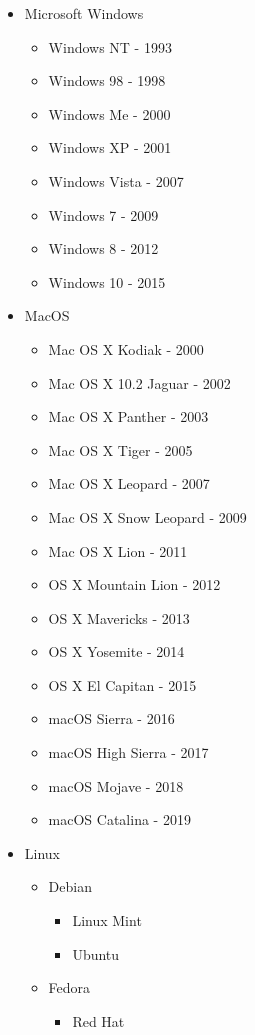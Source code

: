 \documentclass[12pt]{book}
\begin{document}
\begin{latin}
\begin{itemize}
	\item Microsoft Windows
		\begin{itemize}
			\item Windows NT - 1993
			\item Windows 98 - 1998 
			\item Windows Me - 2000
			\item Windows XP - 2001 
			\item Windows Vista - 2007
			\item Windows 7 - 2009 
			\item Windows 8 - 2012 
			\item Windows 10 - 2015 
		\end{itemize}
	\item MacOS
		\begin{itemize}
			\item Mac OS X Kodiak - 2000
			\item Mac OS X 10.2 Jaguar - 2002
			\item Mac OS X Panther - 2003
			\item Mac OS X Tiger -  2005
			\item Mac OS X Leopard - 2007
			\item Mac OS X Snow Leopard - 2009
			\item Mac OS X Lion - 2011
			\item OS X Mountain Lion - 2012
			\item OS X Mavericks - 2013
			\item OS X Yosemite - 2014
			\item OS X El Capitan - 2015
			\item macOS Sierra - 2016
			\item macOS High Sierra - 2017
			\item macOS Mojave - 2018
			\item macOS Catalina - 2019
		\end{itemize}
	\item Linux
		\begin{itemize}
			\item Debian
			\begin{itemize}
				\item Linux Mint 
				\item Ubuntu
			\end{itemize}
			\item Fedora
			\begin{itemize}
				\item Red Hat
			\end{itemize}
		\end{itemize}
\end{itemize}
\end{latin}
\end{document}
